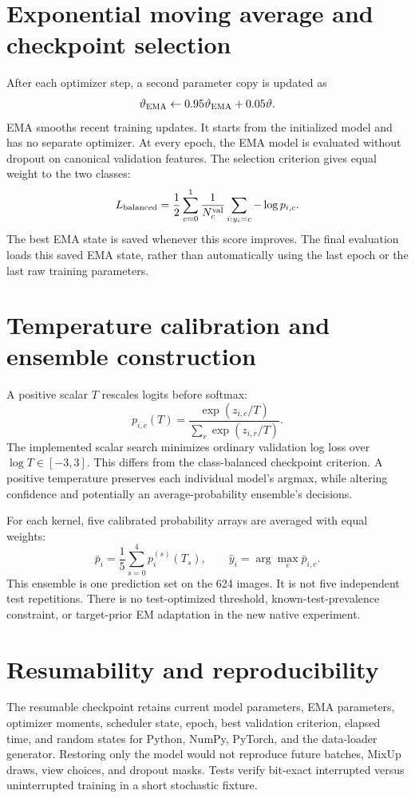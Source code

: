 \documentclass[11pt,a4paper]{report}
\begin{document}
\section{Exponential moving average and checkpoint selection}
After each optimizer step, a second parameter copy is updated as
\begin{equation}
\vartheta_{\rm EMA}\leftarrow0.95\vartheta_{\rm EMA}+0.05\vartheta.
\end{equation}
EMA smooths recent training updates. It starts from the initialized model and has no separate optimizer. At every epoch, the EMA model is evaluated without dropout on canonical validation features. The selection criterion gives equal weight to the two classes:
\begin{equation}
L_{\rm balanced}=\frac12\sum_{c=0}^{1}\frac1{N_c^{\rm val}}
\sum_{i:y_i=c}-\log p_{i,c}.
\end{equation}
The best EMA state is saved whenever this score improves. The final evaluation loads this saved EMA state, rather than automatically using the last epoch or the last raw training parameters.

\section{Temperature calibration and ensemble construction}
A positive scalar $T$ rescales logits before softmax:
\begin{equation}
p_{i,c}(T)=\frac{\exp(z_{i,c}/T)}{\sum_r\exp(z_{i,r}/T)}.
\end{equation}
The implemented scalar search minimizes ordinary validation log loss over $\log T\in[-3,3]$. This differs from the class-balanced checkpoint criterion. A positive temperature preserves each individual model's argmax, while altering confidence and potentially an average-probability ensemble's decisions.

For each kernel, five calibrated probability arrays are averaged with equal weights:
\begin{equation}
\bar p_i=\frac15\sum_{s=0}^{4}p_i^{(s)}(T_s),\qquad
\widehat y_i=\arg\max_c\bar p_{i,c}.
\end{equation}
This ensemble is one prediction set on the 624 images. It is not five independent test repetitions. There is no test-optimized threshold, known-test-prevalence constraint, or target-prior EM adaptation in the new native experiment.

\section{Resumability and reproducibility}
The resumable checkpoint retains current model parameters, EMA parameters, optimizer moments, scheduler state, epoch, best validation criterion, elapsed time, and random states for Python, NumPy, PyTorch, and the data-loader generator. Restoring only the model would not reproduce future batches, MixUp draws, view choices, and dropout masks. Tests verify bit-exact interrupted versus uninterrupted training in a short stochastic fixture.
\end{document}
